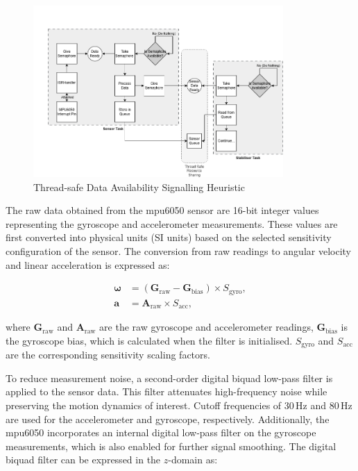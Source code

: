 \begin{figure}[H]
    \centering
    \captionsetup{justification=centering, margin=1cm}
    \includegraphics[width=0.85\textwidth]{img/sensor-semaphore.PNG}
    \caption{Thread-safe Data Availability Signalling Heuristic}
    \label{fig:isr}
\end{figure}

The raw data obtained from the \gls{mpu6050} sensor are 16-bit integer values representing the gyroscope and accelerometer measurements. These values are first converted into physical units (SI units) based on the selected sensitivity configuration of the sensor. The conversion from raw readings to angular velocity and linear acceleration is expressed as:

\begin{align}
\boldsymbol{\omega} &= (\mathbf{G}_{\text{raw}} - \mathbf{G}_{\text{bias}}) \times S_{\text{gyro}}, \\[6pt]
\mathbf{a} &= \mathbf{A}_{\text{raw}} \times S_{\text{acc}},
\end{align}

where \( \mathbf{G}_{\text{raw}} \) and \( \mathbf{A}_{\text{raw}} \) are the raw gyroscope and accelerometer readings, \( \mathbf{G}_{\text{bias}} \) is the gyroscope bias, which is calculated when the filter is initialised. \( S_{\text{gyro}} \) and \( S_{\text{acc}} \) are the corresponding sensitivity scaling factors.

To reduce measurement noise, a second-order digital biquad low-pass filter is applied to the sensor data. This filter attenuates high-frequency noise while preserving the motion dynamics of interest. Cutoff frequencies of 30\,Hz and 80\,Hz are used for the accelerometer and gyroscope, respectively. Additionally, the \gls{mpu6050} incorporates an internal digital low-pass filter on the gyroscope measurements, which is also enabled for further signal smoothing. The digital biquad filter can be expressed in the $z$-domain as:

